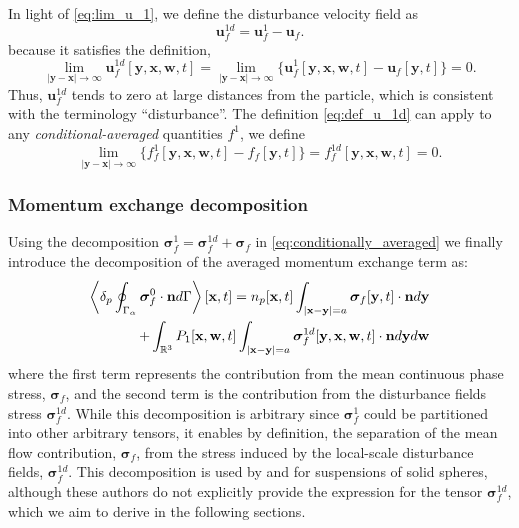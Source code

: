 In light of \ref{eq:lim_u_1}, we define the disturbance velocity field as 
\begin{equation}
    \textbf{u}_f^{1d}
    =
    \textbf{u}_f^1 
    - 
    \textbf{u}_f. 
    \label{eq:def_u_1d}
\end{equation}
because it satisfies the definition, 
\begin{equation}
    \lim_{|\textbf{y}-\textbf{x}|\to\infty} 
    \textbf{u}_f^{1d}[\textbf{y},\textbf{x},\textbf{w},t]
    =
    \lim_{|\textbf{y}-\textbf{x}|\to\infty} 
    \{\textbf{u}_f^1[\textbf{y},\textbf{x},\textbf{w},t]
    - \textbf{u}_f[\textbf{y},t]\}
    = 0.
    \label{eq:lim_u_1d}
\end{equation} 
Thus, $\textbf{u}_f^{1d}$ tends to zero at large distances from the particle, which is consistent with the terminology ``disturbance''.
The definition \ref{eq:def_u_1d} can apply to any \textit{conditional-averaged} quantities $f^1$, we define
\begin{equation}
    \lim_{|\textbf{y}-\textbf{x}|\to\infty} 
    \{f_f^1[\textbf{y},\textbf{x},\textbf{w},t]
    - f_f[\textbf{y},t]\}
    =
    f_f^{1d}[\textbf{y},\textbf{x},\textbf{w},t]
    = 0.
\end{equation} 

\subsubsection{Momentum exchange decomposition}

Using the decomposition $\bm\sigma_f^1 = \bm\sigma_f^{1d} + \bm\sigma_f$ in \ref{eq:conditionally_averaged} we finally introduce the decomposition of the averaged momentum exchange term as:  
\begin{align}
    \pSavg{\bm\sigma_f^0\cdot\textbf{n}}[\textbf{x},t]
    =
    n_p[\textbf{x},t]
    \int_{|\textbf{x}-\textbf{y}|=a}
    \bm\sigma_f[\textbf{y},t]
    \cdot \textbf{n}
    d\textbf{y}
    \nonumber
    \\
    + 
    \int_{\mathbb{R}^3}
    P_1[\textbf{x},\textbf{w},t]
    \int_{|\textbf{x}-\textbf{y}|=a}
    \bm\sigma_f^{1d}[\textbf{y},\textbf{x},\textbf{w},t]
    \cdot \textbf{n}
    d\textbf{y}
    d\textbf{w}
    \label{eq:general_partition}
\end{align}
where the first term represents the contribution from the mean continuous phase stress, $\bm\sigma_f$, and the second term is the contribution from the disturbance fields stress $\bm\sigma_f^{1d}$. 
While this decomposition is arbitrary since $\bm\sigma_f^1$ could be partitioned into other arbitrary tensors, it enables by definition, the separation of the mean flow contribution, $\bm\sigma_f$, from the stress induced by the local-scale disturbance fields, $\bm\sigma_f^{1d}$.
This decomposition is used by \citet[Chapter 2]{jackson2000} and \citet{zhang1997momentum,wang2021numerical,wang2024effect} for suspensions of solid spheres, although these authors do not explicitly provide the expression for the tensor $\bm\sigma_f^{1d}$, which we aim to derive in the following sections. 

